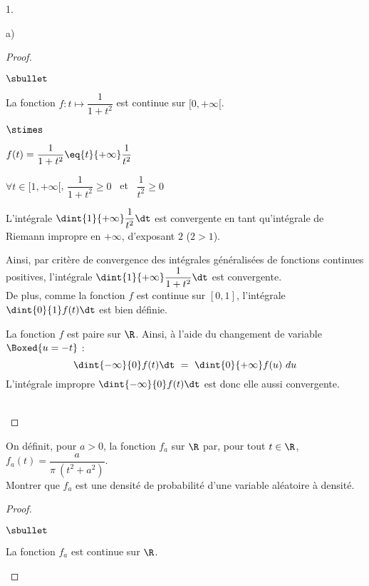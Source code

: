 \begin{noliste}{1.}
\begin{noliste}{a)}
\begin{proof}
\begin{noliste}{$\sbullet$}
      \item La fonction $f : t \mapsto \dfrac{1}{1 + t^2}$ est
        continue sur $[0, +\infty[$.
        \begin{noliste}{$\stimes$}
        \item $f(t) = \dfrac{1}{1 + t^2} \eq{t}{+\infty}
          \dfrac{1}{t^2}$

        \item $\forall t \in [1, +\infty[$, $\dfrac{1}{1 + t^2} \geq
          0$ \ et \ $\dfrac{1}{t^2} \geq 0$

        \item L'intégrale $\dint{1}{+\infty} \dfrac{1}{t^2} \dt$ est
          convergente en tant qu'intégrale de Riemann impropre en
          $+\infty$, d'exposant $2$ ($2 > 1$).          
        \end{noliste}
        Ainsi, par critère de convergence des intégrales généralisées
        de fonctions continues positives, l'intégrale
        $\dint{1}{+\infty} \dfrac{1}{1+t^2} \dt$ est convergente.\\
        De plus, comme la fonction $f$ est continue sur $[0, 1]$,
        l'intégrale $\dint{0}{1} f(t) \dt$ est bien définie.%

      \item La fonction $f$ est paire sur $\R$. Ainsi, à l'aide du
        changement de variable $\Boxed{u = -t}$ :
        \[
        \dint{-\infty}{0} f(t) \dt \ = \ \dint{0}{+\infty} f(u) \ du
        \]
        L'intégrale impropre $\dint{-\infty}{0} f(t) \dt$ est donc
        elle aussi convergente.
      \end{noliste}
      ~\\[-1cm]
    \end{proof}
    
    
    \newpage
    
    

  \item On définit, pour $a > 0$, la fonction $f_a$ sur $\R$ par, pour
    tout $t \in \R$, $f_a(t) = \dfrac{a}{\pi \ (t^2+a^2)}$.\\
    Montrer que $f_a$ est une densité de probabilité d'une variable
    aléatoire à densité.

    \begin{proof}~%
      \begin{noliste}{$\sbullet$}
      \item La fonction $f_a$ est continue sur $\R$.


\end{noliste}
\end{proof}
\end{noliste}
\end{noliste}
